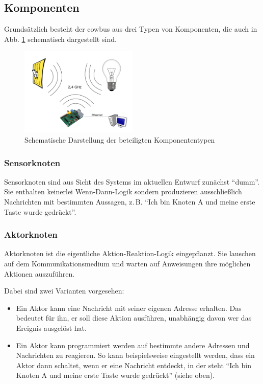 \documentclass{IEEEtran}
\begin{document}
    \subsection{Komponenten}
        Grundsätzlich besteht der cowbus aus drei Typen von Komponenten,
        die auch in Abb. \ref{fig:comp} schematisch dargestellt sind.

        \begin{figure}
            \centering
            \includegraphics[width=0.5\textwidth]{img/system}
            \caption{Schematische Darstellung der beteiligten Komponententypen}
            \label{fig:comp}
        \end{figure}

        \subsubsection{Sensorknoten}\label{Sensorknoten}
            Sensorknoten sind aus Sicht des Systems im aktuellen Entwurf
            zunächst \enquote{dumm}. Sie enthalten keinerlei Wenn-Dann-Logik
            sondern produzieren ausschließlich Nachrichten mit bestimmten
            Aussagen, z.\,B. \enquote{Ich bin Knoten A und meine erste Taste
            wurde gedrückt}.
        \subsubsection{Aktorknoten}\label{Aktorknoten}
            Aktorknoten ist die eigentliche Aktion-Reaktion-Logik eingepflanzt.
            Sie lauschen auf dem Kommunikationsmedium und warten auf Anweisungen
            ihre möglichen Aktionen auszuführen.

            Dabei sind zwei Varianten vorgesehen:
            \begin{itemize}
                \item Ein Aktor kann eine Nachricht mit seiner eigenen Adresse
                    erhalten. Das bedeutet für ihn, er soll diese Aktion
                    ausführen, unabhängig davon wer das Ereignis ausgelöst hat.
                \item Ein Aktor kann programmiert werden auf bestimmte andere
                    Adressen und Nachrichten zu reagieren.
                    So kann beispielsweise eingestellt werden, dass ein Aktor
                    dann schaltet, wenn er eine Nachricht entdeckt, in der steht
                    \enquote{Ich bin Knoten A und meine erste Taste
                    wurde gedrückt} (siehe oben).
            \end{itemize}
\end{document}
